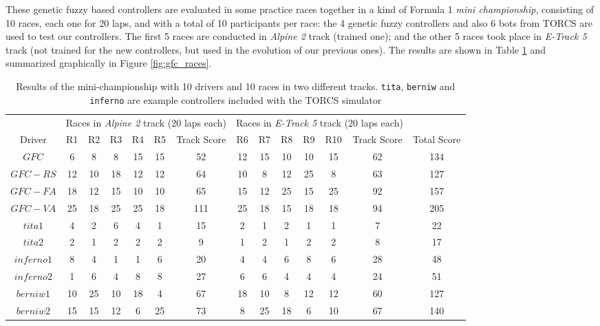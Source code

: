 \documentclass[conference]{IEEEtran}
\begin{document}
These genetic fuzzy based controllers are evaluated in some practice
races together in a kind of Formula 1 {\em mini championship}, consisting of
10 races, each one for 20 laps, and with a total of 10 participants
per race: the 4 genetic fuzzy controllers and also 6 bots from TORCS
are used to test our controllers. The first 5 races are conducted in
\textit{Alpine 2} track (trained one); and the other 5 races took
place in \textit{E-Track 5} track (not trained for the new
controllers, but used in the evolution of our previous ones). 
The results are shown in Table \ref{tab:chsresults} and summarized
graphically in Figure \ref{fig:gfc_races}. 
%
\begin{table}[ht]
  \centering
  {\scriptsize
    \caption{ Results of the mini-championship with 10 drivers and 10
      races in two different tracks. {\tt tita}, {\tt berniw} and {\tt
      inferno} are example controllers included with the TORCS
    simulator \cite{torcs4}}
    {
			\begin{tabular}{|c||c|c|c|c|c|c||c|c|c|c|c|c||c|}
				\hline
			&\multicolumn{6}{|c|}{Races in \textit{Alpine 2} track (20 laps each)} &	\multicolumn{6}{|c|}{Races in \textit{E-Track 5} track (20 laps each)}&\\
					\cline{2-13}
Driver&{R1}&{R2}&{R3}&{R4}&{R5}&Track Score&{R6}&{R7}&{R8}& {R9}&{R10}&Track Score& Total Score\\
				\hline
$GFC$	&	6&	8&	8&	15&15		&52&	12&	15&	10&	10&	15&62&134\\
$GFC-RS$&	12&	10&	18&	12&12		&64&	10&	8&	12&	25&	8&63&127\\
$GFC-FA$&	18&	12&	15&	10&10		&65&	15&	12&	25&	15&	25&92&157\\
$GFC-VA$&	25&	18&	25&	25&18		&111&	25&	18&	15&	18&18	&94&205\\
$tita1$	&	4&	2&	6&	4&1			&15&	2&	1&	2&	1&	1&7&22\\
$tita2$	&	2&	1&	2&	2&2			&9&	1&	2&	1&	2&	2&8&17\\
$inferno1$&	8&	4&	1&	1&6			&20&	4&	4&	6&	8&	6&28&48\\
$inferno2$&	1&	6&	4&	8&8			&27&	6&	6&	4&	4&	4&24&51\\
$berniw1$&	10&	25&	10&	18&4		&67&	18&	10&	8&	12&	12&60&127\\
$berniw2$&	15&	15&	12&	6&25		&73&	8&	25&	18&	6&	10&67&140\\
\hline
				
			\end{tabular}
		}\label{tab:chsresults}
	}
\end{table}
%
\end{document}
